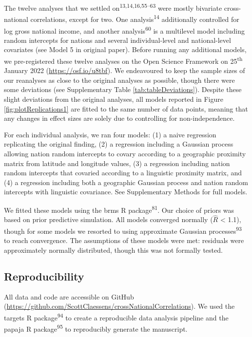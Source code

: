 \documentclass[
  man,floatsintext]{apa6}
\begin{document}
The twelve analyses that we settled on\textsuperscript{13,14,16,55--63} were mostly bivariate cross-national correlations, except for two. One analysis\textsuperscript{14} additionally controlled for log gross national income, and another analysis\textsuperscript{60} is a multilevel model including random intercepts for nations and several individual-level and national-level covariates (see Model 5 in original paper). Before running any additional models, we pre-registered these twelve analyses on the Open Science Framework on 25\textsuperscript{th} January 2022 (\url{https://osf.io/u8tbf}). We endeavoured to keep the sample sizes of our reanalyses as close to the original analyses as possible, though there were some deviations (see Supplementary Table \ref{tab:tableDeviations}). Despite these slight deviations from the original analyses, all models reported in Figure \ref{fig:plotReplications1} are fitted to the same number of data points, meaning that any changes in effect sizes are solely due to controlling for non-independence.

For each individual analysis, we ran four models: (1) a naive regression replicating the original finding, (2) a regression including a Gaussian process allowing nation random intercepts to covary according to a geographic proximity matrix from latitude and longitude values, (3) a regression including nation random intercepts that covaried according to a linguistic proximity matrix, and (4) a regression including both a geographic Gaussian process and nation random intercepts with linguistic covariance. See Supplementary Methods for full models.

We fitted these models using the brms R package\textsuperscript{81}. Our choice of priors was based on prior predictive simulation. All models converged normally (\(\hat{R}\) \textless{} 1.1), though for some models we resorted to using approximate Gaussian processes\textsuperscript{93} to reach convergence. The assumptions of these models were met: residuals were approximately normally distributed, though this was not formally tested.

\hypertarget{reproducibility}{%
\subsection{Reproducibility}\label{reproducibility}}

All data and code are accessible on GitHub (\url{https://github.com/ScottClaessens/crossNationalCorrelations}). We used the targets R package\textsuperscript{94} to create a reproducible data analysis pipeline and the papaja R package\textsuperscript{95} to reproducibly generate the manuscript.
\end{document}
